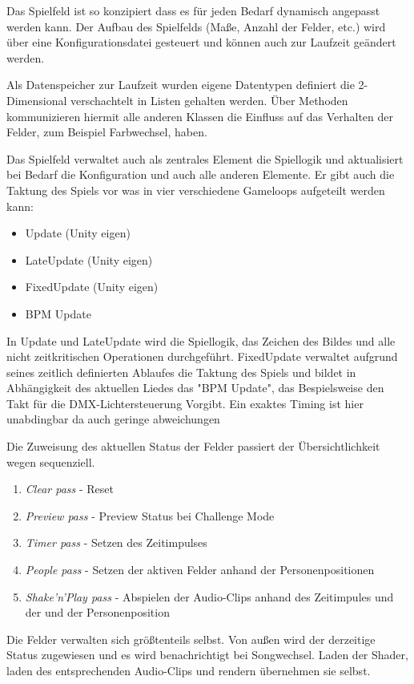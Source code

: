 
Das Spielfeld ist so konzipiert dass es für jeden Bedarf dynamisch angepasst werden kann. Der Aufbau des Spielfelds (Maße, Anzahl der Felder, etc.) wird über eine Konfigurationsdatei gesteuert und können auch zur Laufzeit geändert werden.

Als Datenspeicher zur Laufzeit wurden eigene Datentypen definiert die 2-Dimensional verschachtelt in Listen gehalten werden. Über Methoden kommunizieren hiermit alle anderen Klassen die Einfluss auf das Verhalten der Felder, zum Beispiel Farbwechsel, haben.

Das Spielfeld verwaltet auch als zentrales Element die Spiellogik und aktualisiert bei Bedarf die Konfiguration und auch alle anderen Elemente. Er gibt auch die Taktung des Spiels vor was in vier verschiedene Gameloops aufgeteilt werden kann:
\begin{itemize}
\item Update (Unity eigen)
\item LateUpdate (Unity eigen)
\item FixedUpdate (Unity eigen)
\item BPM Update
\end{itemize}

In Update und LateUpdate wird die Spiellogik, das Zeichen des Bildes und alle nicht zeitkritischen Operationen durchgeführt.
FixedUpdate verwaltet aufgrund seines zeitlich definierten Ablaufes die Taktung des Spiels und bildet in Abhängigkeit des aktuellen Liedes das "BPM Update", das Bespielsweise den Takt für die DMX-Lichtersteuerung Vorgibt.
Ein exaktes Timing ist hier unabdingbar da auch geringe abweichungen 

Die Zuweisung des aktuellen Status der Felder passiert der Übersichtlichkeit wegen sequenziell.
\begin{enumerate}
\item \emph{Clear pass} - Reset
\item \emph{Preview pass} - Preview Status bei Challenge Mode
\item \emph{Timer pass} - Setzen des Zeitimpulses
\item \emph{People pass} - Setzen der aktiven Felder anhand der Personenpositionen
\item \emph{Shake'n'Play pass} - Abspielen der Audio-Clips anhand des Zeitimpules und der und der Personenposition
\end{enumerate}

Die Felder verwalten sich größtenteils selbst. Von außen wird der derzeitige Status zugewiesen und es wird benachrichtigt bei Songwechsel. Laden der Shader, laden des entsprechenden Audio-Clips und rendern übernehmen sie selbst.